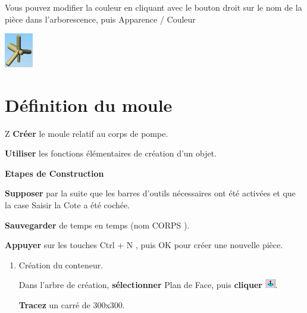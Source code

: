 \begin{minipage}{0.7\linewidth}
Vous pouvez modifier la couleur en cliquant avec le bouton droit sur le nom de la pièce dans 
l'arborescence, puis Apparence / Couleur 
\end{minipage}
\hfill
\begin{minipage}{0.29\linewidth}
 \includegraphics[height=1.5cm]{img/SW-034.png}
\end{minipage}

\newpage

\section{Définition du moule}
Z
\textbf{Créer} le moule relatif au corps de pompe. 

\textbf{Utiliser} les fonctions élémentaires de création d'un objet. 

\textbf{Etapes de Construction}

\textbf{Supposer} par la suite que les barres d'outils nécessaires ont été activées et que la case \og Saisir la Cote \fg a été cochée. 
 
\textbf{Sauvegarder} de temps en temps (nom CORPS ). 
 
\textbf{Appuyer} sur les touches \og Ctrl + N \fg , puis OK pour créer une nouvelle pièce. 

\begin{enumerate}
 \item  Création du conteneur.

Dans l'arbre de création, \textbf{sélectionner} Plan de Face, puis \textbf{cliquer} \includegraphics[height=0.4cm]{img/SW-035.png}.

\textbf{Tracez} un carré de 300x300.
\end{enumerate}

